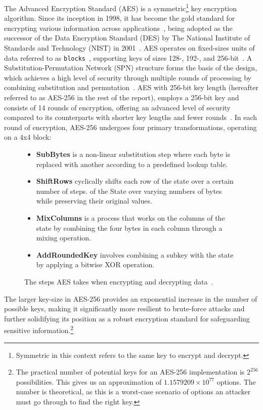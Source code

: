 The Advanced Encryption Standard (AES) is a symmetric\footnote{
  Symmetric in this context refers to the same key to encrypt and
  decrypt.
} key encryption algorithm.
Since its inception in 1998, it has become the gold standard for encrypting various
information across applications~\cite{schneier2015applied,rijndael_book}, being
adopted as the successor of the Data Encryption Standard (DES) by The National
Institute of Standards and Technology (NIST) in 2001~\cite{nist_aes_winner}.
AES operates on fixed-sizes units of data referred to as \texttt{blocks}~\cite{nistfips197blocks},
supporting keys of sizes 128-, 192-, and 256-bit~\cite{nistfips197intro}.
A Substitution-Permutation Network (SPN) structure forms the basis of the design,
which achieves a high level of security through multiple rounds of processing by
combining substitution and permutation~\cite{nistfips197specification}.
AES with 256-bit key length (hereafter referred to as AES-256 in the rest
of the report), employs a 256-bit key and consists of 14 rounds of encryption,
offering an advanced level of security compared to its counterparts with shorter
key lengths and fewer rounds~\cite{nistfips197256}.
In each round of encryption, AES-256 undergoes four primary transformations,
operating on a 4x4 block:
\begin{figure}[htbp]
  \begin{itemize}
    \item \textbf{SubBytes} is a non-linear substitution step where each byte is
    replaced with another according to a predefined lookup table.
    \item \textbf{ShiftRows} cyclically shifts each row of the state over a
    certain number of steps.
    of the State over varying numbers of bytes while preserving their original
    values.
    \item \textbf{MixColumns} is a process that works on the columns of the
    state by combining the four bytes in each column through a mixing operation.
    \item \textbf{AddRoundedKey} involves combining a subkey with the state\protect\footnotemark
    by applying a bitwise XOR operation.
  \end{itemize}
  \caption{The steps AES takes when encrypting and decrypting data~\cite{nistfips197specification}.}
  \label{fig:aessteps}
\end{figure}
\newline
The larger key-size in AES-256 provides an exponential increase in the number of
possible keys, making it significantly more resilient to brute-force attacks
and further solidifying its position as a robust encryption standard for
safeguarding sensitive information.\footnote{
  The practical number of potential keys for an AES-256 implementation is
  $2^{256}$ possibilities. This gives us an approximation of $1.1579209 \times 10^{77}$
  options.
  The number is theoretical, as this is a worst-case scenario of options an
  attacker must go through to find the right key.
}

